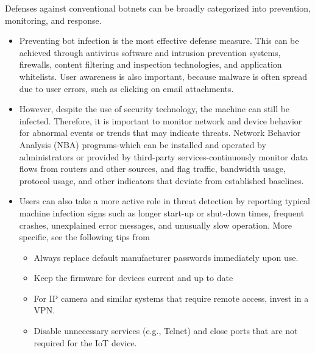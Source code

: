 \documentclass[conference]{IEEEtran}
\begin{document}
Defenses against conventional botnets can be broadly categorized into prevention, monitoring, and response.
\begin{itemize}
\item{Preventing bot infection is the most effective defense measure. This can be achieved through antivirus software and intrusion prevention systems, firewalls, content filtering and inspection technologies, and application whitelists. User awareness is also important, because malware is often spread due to user errors, such as clicking on email attachments.}
\item{However, despite the use of security technology, the machine can still be infected. Therefore, it is important to monitor network and device behavior for abnormal events or trends that may indicate threats. Network Behavior Analysis (NBA) programs-which can be installed and operated by administrators or provided by third-party services-continuously monitor data flows from routers and other sources, and flag traffic, bandwidth usage, protocol usage, and other indicators that deviate from established baselines.}
\item{Users can also take a more active role in threat detection by reporting typical machine infection signs such as longer start-up or shut-down times, frequent crashes, unexplained error messages, and unusually slow operation. More specific, see the following tips from \cite{b9}}
\begin{itemize}
\item{Always replace default manufacturer passwords immediately upon use. }
\item{Keep the firmware for devices current and up to date}
\item{For IP camera and similar systems that require remote access, invest in a VPN.}
\item{Disable unnecessary services (e.g., Telnet) and close ports that are not required for the IoT device.}


\end{itemize}
\end{itemize}
\end{document}
